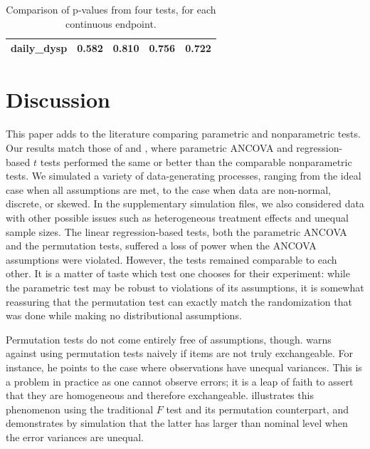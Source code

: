 \documentclass[12pt]{article}
\newcommand{\todo}[1]{{\color{red}{TO DO: \sc #1}}}
\begin{document}
\begin{table}[]
\begin{tabular}{l|cccc}
daily\_dysp   & 0.582                      & 0.810                                                                                & 0.756                                                                        & 0.722                                                                        \\
\hline
\end{tabular}
\caption{Comparison of p-values from four tests, for each continuous endpoint.} 
\end{table}

\section{Discussion}

This paper adds to the literature comparing parametric and nonparametric tests.
Our results match those of \citet{vickers_parametric_2005} and \citet{anderson_empirical_1999}, where parametric ANCOVA and regression-based $t$ tests performed the same or better than the comparable nonparametric tests.
We simulated a variety of data-generating processes, ranging from the ideal case when all assumptions are met, 
to the case when data are non-normal, discrete, or skewed.
In the supplementary simulation files, we also considered data with other possible issues such as heterogeneous treatment effects and unequal sample sizes.
The linear regression-based tests, both the parametric ANCOVA and the permutation tests, suffered a loss of power when the ANCOVA assumptions were violated.
However, the tests remained comparable to each other.
It is a matter of taste which test one chooses for their experiment: while the parametric test may be robust to violations of its assumptions, it is somewhat reassuring that the permutation test can exactly match the randomization that was done while making no distributional assumptions.
\todo{reiterate secondary analysis point}

Permutation tests do not come entirely free of assumptions, though.  
\cite{romano_behavior_1990} warns against using permutation tests naively if items are not truly exchangeable. 
For instance, he points to the case where observations have unequal variances.  
This is a problem in practice as one cannot observe errors; it is a leap of faith to assert that they are homogeneous and therefore exchangeable.
\cite{boik_fisherpitman_1987} illustrates this phenomenon using the traditional $F$ test and its permutation counterpart, 
and demonstrates by simulation that the latter has larger than nominal level when the error variances are unequal.
\end{document}
